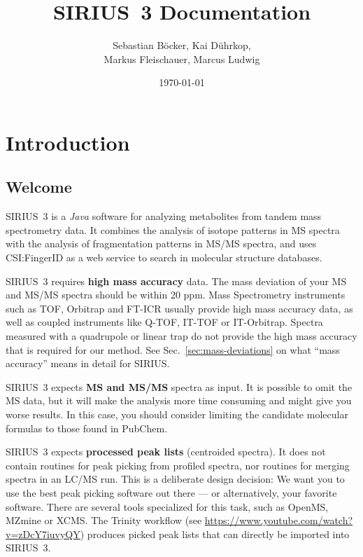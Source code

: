 \documentclass[letterpaper,10pt,openany,oneside]{sphinxmanual}
\title{SIRIUS~3 Documentation}
\date{\today}
\author{Sebastian Böcker, Kai Dührkop, \\ Markus Fleischauer, Marcus Ludwig}
\begin{document}
\maketitle
\tableofcontents
{}\label{index::doc}



\chapter{Introduction}
\label{introduction:introduction}
\label{introduction::doc}
\label{introduction:welcome-to-sirius-s-documentation}

\section{Welcome}

SIRIUS~3 is a \emph{Java} software for analyzing metabolites from tandem mass
spectrometry data. It combines the analysis of isotope patterns in MS spectra
with the analysis of fragmentation patterns in MS/MS spectra, and uses
CSI:FingerID as a web service to search in molecular structure databases.

SIRIUS~3 requires \textbf{high mass accuracy} data. The mass deviation of
your MS and MS/MS spectra should be within 20 ppm.  Mass Spectrometry
instruments such as TOF, Orbitrap and FT-ICR usually provide high mass
accuracy data, as well as coupled instruments like Q-TOF, IT-TOF or
IT-Orbitrap.  Spectra measured with a quadrupole or linear trap do not
provide the high mass accuracy that is required for our method.  See
Sec.~\ref{sec:mass-deviations} on what ``mass accuracy'' means in detail for
SIRIUS.

SIRIUS~3 expects \textbf{MS and MS/MS} spectra as input.  It is possible to
omit the MS data, but it will make the analysis more time consuming and
might give you worse results.  In this case, you should consider limiting the
candidate molecular formulas to those found in PubChem.

SIRIUS~3 expects \textbf{processed peak lists} (centroided spectra). It does
not contain routines for peak picking from profiled spectra, nor routines for
merging spectra in an LC/MS run.  This is a deliberate design decision: We
want you to use the best peak picking software out there --- or
alternatively, your favorite software.  There are several tools specialized
for this task, such as OpenMS, MZmine or XCMS.  The Trinity workflow
(see \url{https://www.youtube.com/watch?v=zDcY7iuvyQY}) produces picked peak
lists that can directly be imported into SIRIUS~3.
\end{document}
